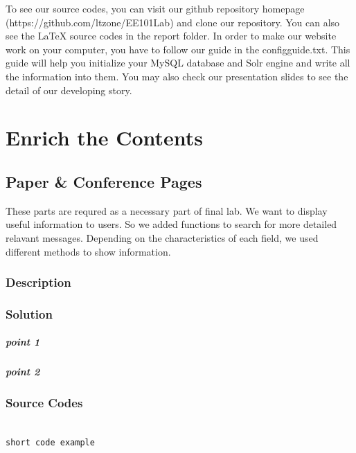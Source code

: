 \documentclass{book}
\begin{document}
To see our source codes, you can visit our github repository homepage (https://github.com/ltzone/EE101Lab) and clone our repository. You can also see the LaTeX source codes in the report folder. In order to make our website work on your computer, you have to follow our guide in the configguide.txt. This guide will help you initialize your MySQL database and Solr engine and write all the information into them. You may also check our presentation slides to see the detail of our developing story.



\mainmatter
\chapter {Enrich the Contents}

\section {Paper \& Conference Pages}

These parts are requred as a necessary part of final lab. We want to display useful information to users. So we added functions to search for more detailed relavant messages.
Depending on the characteristics of each field, we used different methods to show information.


\subsection{Description}

\subsection{Solution}

\paragraph{point 1}

\paragraph{point 2}

\subsection{Source Codes}

\begin{minipage}[r]{15em}
\begin{verbatim}

short code example

\end{verbatim}
\end{minipage}
\end{document}
